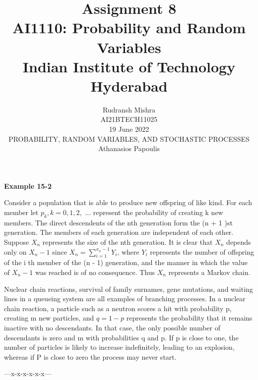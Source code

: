 \documentclass[journal,12pt,twocolumn]{IEEEtran}
\title{Assignment 8 \\ \Large AI1110: Probability and Random Variables \\ \large Indian Institute of Technology Hyderabad}
\author{Rudransh Mishra \\ \normalsize AI21BTECH11025 \\ \vspace*{20pt} \normalsize  19 June 2022 \\ \vspace*{20pt} PROBABILITY, RANDOM VARIABLES, AND STOCHASTIC PROCESSES\\ \normalsize Athanasios Papoulis}
\begin{document}
\maketitle

\textbf{Example 15-2}

Consider a population that is able to produce new offspring of like kind. For each member let $p_k, k = 0, 1, 2,$ ... represent the probability of creating k new members. The direct descendents of the nth generation form the (n + 1 )st generation. The members of each generation are independent of each other. Suppose $X_n$ represents the size of the nth generation. It is clear that $X_n$ depends only on $X_n-1$ since $X_n = \sum_{i=1}^{x_n-1}Y_i$, where $Y_i$ represents the number of offspring of the i th member of the (n - 1) generation, and the manner in which the value of $X_n-1$ was reached is of no consequence. Thus $X_n$ represents a Markov chain.

Nuclear chain reactions, survival of family surnames, gene mutations, and waiting lines in a queueing system are all examples of branching processes. In a nuclear chain reaction, a particle such as a neutron scores a hit with probability p, creating m new particles, and $q = 1-p$ represents the probability that it remains inactive with no descendants. In that case, the only possible number of descendants is zero and m with probabilities q and p. If p is close to one, the number of particles is likely to increase indefinitely, leading to an explosion, whereas if P is close to zero the process may never start.

\begin{center} ---x-x-x-x-x-x--- \end{center}
\end{document}
